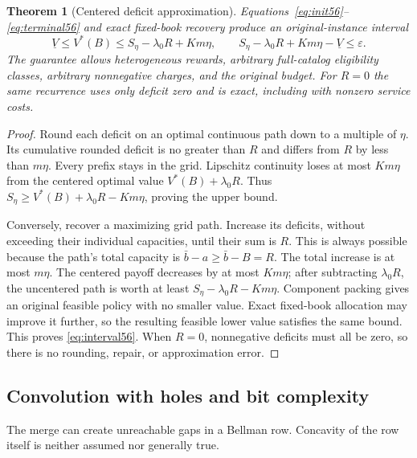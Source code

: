 \documentclass[11pt,letterpaper]{article}
\newtheorem{theorem}{Theorem}[section]
\theoremstyle{definition}\newtheorem{remark}[theorem]{Remark}
\begin{document}
\begin{theorem}[Centered deficit approximation]\label{thm:approx56}
Equations~\eqref{eq:init56}--\eqref{eq:terminal56} and exact fixed-book recovery produce an original-instance interval
\begin{equation}\label{eq:interval56}
 \underline V\leq V^*(B)\leq S_\eta-\lambda_0R+Km\eta,
 \qquad S_\eta-\lambda_0R+Km\eta-\underline V\leq\varepsilon.
\end{equation}
The guarantee allows heterogeneous rewards, arbitrary full-catalog eligibility classes, arbitrary nonnegative charges, and the original budget. For $R=0$ the same recurrence uses only deficit zero and is exact, including with nonzero service costs.
\end{theorem}
\begin{proof}
Round each deficit on an optimal continuous path down to a multiple of $\eta$. Its cumulative rounded deficit is no greater than $R$ and differs from $R$ by less than $m\eta$. Every prefix stays in the grid. Lipschitz continuity loses at most $Km\eta$ from the centered optimal value $V^*(B)+\lambda_0R$. Thus $S_\eta\geq V^*(B)+\lambda_0R-Km\eta$, proving the upper bound.

Conversely, recover a maximizing grid path. Increase its deficits, without exceeding their individual capacities, until their sum is $R$. This is always possible because the path's total capacity is $\bar b-a\geq\bar b-B=R$. The total increase is at most $m\eta$. The centered payoff decreases by at most $Km\eta$; after subtracting $\lambda_0R$, the uncentered path is worth at least $S_\eta-\lambda_0R-Km\eta$. Component packing gives an original feasible policy with no smaller value. Exact fixed-book allocation may improve it further, so the resulting feasible lower value satisfies the same bound. This proves \eqref{eq:interval56}. When $R=0$, nonnegative deficits must all be zero, so there is no rounding, repair, or approximation error.
\end{proof}

\subsection{Convolution with holes and bit complexity}
The merge can create unreachable gaps in a Bellman row. Concavity of the row itself is neither assumed nor generally true.
\end{document}
